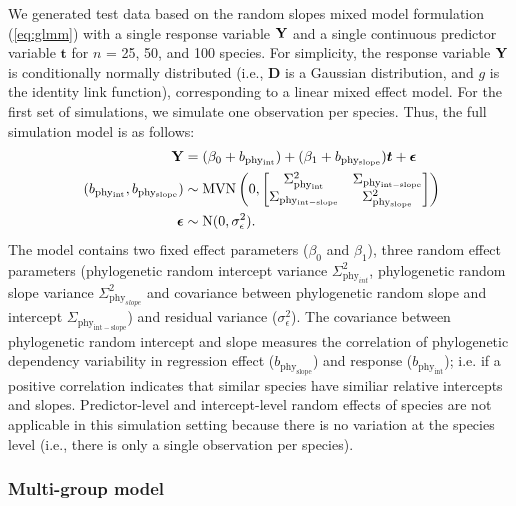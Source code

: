 \documentclass[12pt]{article}
\begin{document}
We generated test data based on the random slopes mixed model formulation (\ref{eq:glmm}) with a single response variable ${\mathbf Y}$ and a single continuous predictor variable $\bm{t}$ for $n$ = 25, 50, and 100 species.
For simplicity, the response variable ${\mathbf Y}$ is conditionally normally distributed (i.e., $\bm{D}$ is a Gaussian distribution, and $g$ is the identity link function), corresponding to a linear mixed effect model. 
For the first set of simulations, we simulate one observation per species.
Thus, the full simulation model is as follows:
\begin{equation}
\begin{aligned}
{\mathbf Y} & = (\beta_0 + b_{\mathrm{phy_{int}}}) + (\beta_1 + b_{\mathrm{phy_{slope}}}) \bm{t} + {\boldsymbol \epsilon} \\\
(b_{\mathrm{phy_{int}}}, b_{\mathrm{phy_{slope}}}) & \sim \textrm{MVN} \left( 0, \begin{bmatrix}
\Sigma^2_{\mathrm{phy_{int}}} & \Sigma_{\mathrm{phy_{int-slope}}} \\ 
\Sigma_{\mathrm{phy_{int-slope}}} & \Sigma^2_{\mathrm{phy_{slope}}}
\end{bmatrix} 
\right) \\ 
{\boldsymbol \epsilon} & \sim \textrm{N} ( 0 , \sigma_{\epsilon}^2) .
\label{eq:single_glmm}
\end{aligned}
\end{equation}
The model contains two fixed effect parameters ($\beta_0$ and $\beta_1$), three random effect parameters (phylogenetic random intercept variance $\Sigma^2_{\mathrm{phy}_{int}}$, phylogenetic random slope variance $\Sigma^2_{\mathrm{phy}_{slope}}$ and covariance between phylogenetic random slope and intercept $\Sigma_{\mathrm{phy_{int-slope}}}$) and residual variance ($\sigma_{\epsilon}^2$).  
The covariance between phylogenetic random intercept and slope measures the correlation of phylogenetic dependency variability in regression effect ($b_{\mathrm{phy_{slope}}}$) and response ($b_{\mathrm{phy_{int}}}$); i.e. if a positive correlation indicates that similar species have similiar relative intercepts and slopes.
Predictor-level and intercept-level random effects of species are not applicable in this simulation setting because there is no variation at the species level (i.e., there is only a single observation per species).

\subsubsection*{Multi-group model}
\end{document}
